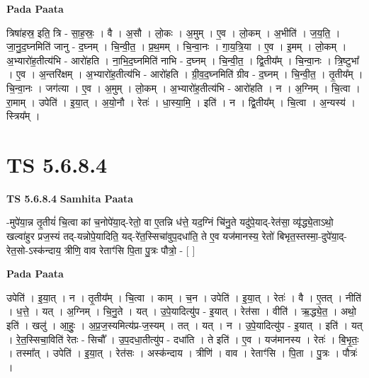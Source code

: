 \documentclass[17pt]{extarticle}
\begin{document}
\textbf{Pada Paata} \newline

त्रिषा॑हस्र॒ इति॒ त्रि - सा॒ह॒स्रः॒ । वै । अ॒सौ । लो॒कः । अ॒मुम् । ए॒व । लो॒कम् । अ॒भीति॑ । ज॒य॒ति॒ । जा॒नु॒द॒घ्नमिति॑ जानु - द॒घ्नम् । चि॒न्वी॒त॒ । प्र॒थ॒मम् । चि॒न्वा॒नः । गा॒य॒त्रि॒या । ए॒व । इ॒मम् । लो॒कम् । अ॒भ्यारो॑ह॒तीत्य॑भि - आरो॑हति । ना॒भि॒द॒घ्नमिति॑ नाभि - द॒घ्नम् । चि॒न्वी॒त॒ ।  द्वि॒तीय᳚म् । चि॒न्वा॒नः । त्रि॒ष्टुभा᳚ । ए॒व । अ॒न्तरि॑क्षम् । अ॒भ्यारो॑ह॒तीत्य॑भि - आरो॑हति । ग्री॒व॒द॒घ्नमिति॑ ग्रीव - द॒घ्नम् । चि॒न्वी॒त॒ । तृ॒तीय᳚म् । चि॒न्वा॒नः । जग॑त्या । ए॒व । अ॒मुम् ।  लो॒कम् । अ॒भ्यारो॑ह॒तीत्य॑भि - आरो॑हति । न । अ॒ग्निम् । चि॒त्वा । रा॒माम् । उपेति॑ । इ॒या॒त् । अ॒यो॒नौ । रेतः॑ । धा॒स्या॒मि॒ । इति॑ । न । द्वि॒तीय᳚म् । चि॒त्वा । अ॒न्यस्य॑ । स्त्रिय᳚म् ।  \newline





\section{ TS 5.6.8.4 }

\textbf{TS 5.6.8.4 } \newline
\textbf{Samhita Paata} \newline

-मुपे॑या॒न्न तृ॒तीयं॑ चि॒त्वा कां च॒नोपे॑या॒द्-रेतो॒ वा ए॒तन्नि ध॑त्ते॒ यद॒ग्निं चि॑नु॒ते यदु॑पे॒याद्-रेत॑सा॒ व्यृ॑द्ध्ये॒ताऽथो॒ खल्वा॑हुर प्रज॒स्यं तद्-यन्नोपे॒यादिति॒ यद्-रे॑त॒स्सिचा॑वुप॒दधा॑ति॒ ते ए॒व यज॑मानस्य॒ रेतो॑ बिभृत॒स्तस्मा॒-दुपे॑या॒द्-रेत॒सो-ऽस्क॑न्दाय॒ त्रीणि॒ वाव रेताꣳ॑सि पि॒ता पु॒त्रः पौत्रो॒ - [  ] \newline

\textbf{Pada Paata} \newline

उपेति॑ । इ॒या॒त् । न । तृ॒तीय᳚म् । चि॒त्वा । काम् । च॒न । उपेति॑ । इ॒या॒त् । रेतः॑ । वै । ए॒तत् । नीति॑ । ध॒त्ते॒ । यत् । अ॒ग्निम् । चि॒नु॒ते । यत् । उ॒पे॒यादित्यु॑प - इ॒यात् । रेत॑सा । वीति॑ । ऋ॒द्ध्ये॒त॒ । अथो॒ इति॑ । खलु॑ । आ॒हुः॒ । अ॒प्र॒ज॒स्यमित्य॑प्र-ज॒स्यम् । तत् । यत् । न । उ॒पे॒यादित्यु॑प - इ॒यात् । इति॑ । यत् । रे॒त॒स्सिचा॒विति॑ रेतः - सिचौ᳚ । उ॒प॒दधा॒तीत्यु॑प - दधा॑ति । ते इति॑ । ए॒व । यज॑मानस्य । रेतः॑ । बि॒भृ॒तः॒ । तस्मा᳚त् । उपेति॑ । इ॒या॒त् । रेत॑सः । अस्क॑न्दाय । त्रीणि॑ । वाव । रेताꣳ॑सि । पि॒ता । पु॒त्रः । पौत्रः॑ ।  \newline
\end{document}
